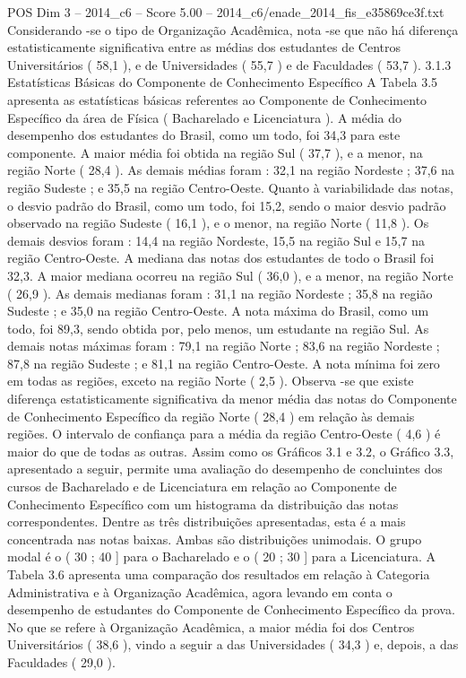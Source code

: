 \begin{textsample}{POS Dim 3 – 2014\_c6 – Score 5.00 – 2014\_c6/enade\_2014\_fis\_e35869ce3f.txt}
Considerando -se o tipo de Organização Acadêmica, nota -se que não há diferença estatisticamente significativa entre as médias dos estudantes de Centros Universitários ( 58,1 ), e de Universidades ( 55,7 ) e de Faculdades ( 53,7 ). 3.1.3 Estatísticas Básicas do Componente de Conhecimento Específico A Tabela 3.5 apresenta as estatísticas básicas referentes ao Componente de Conhecimento Específico da área de Física ( Bacharelado e Licenciatura ).
A média do desempenho dos estudantes do Brasil, como um todo, foi 34,3 para este componente.
A maior média foi obtida na região Sul ( 37,7 ), e a menor, na região Norte ( 28,4 ).
As demais médias foram : 32,1 na região Nordeste ; 37,6 na região Sudeste ; e 35,5 na região Centro-Oeste.
Quanto à variabilidade das notas, o desvio padrão do Brasil, como um todo, foi 15,2, sendo o maior desvio padrão observado na região Sudeste ( 16,1 ), e o menor, na região Norte ( 11,8 ).
Os demais desvios foram : 14,4 na região Nordeste, 15,5 na região Sul e 15,7 na região Centro-Oeste.
A mediana das notas dos estudantes de todo o Brasil foi 32,3.
A maior mediana ocorreu na região Sul ( 36,0 ), e a menor, na região Norte ( 26,9 ).
As demais medianas foram : 31,1 na região Nordeste ; 35,8 na região Sudeste ; e 35,0 na região Centro-Oeste.
A nota máxima do Brasil, como um todo, foi 89,3, sendo obtida por, pelo menos, um estudante na região Sul.
As demais notas máximas foram : 79,1 na região Norte ; 83,6 na região Nordeste ; 87,8 na região Sudeste ; e 81,1 na região Centro-Oeste.
A nota mínima foi zero em todas as regiões, exceto na região Norte ( 2,5 ).
Observa -se que existe diferença estatisticamente significativa da menor média das notas do Componente de Conhecimento Específico da região Norte ( 28,4 ) em relação às demais regiões.
O intervalo de confiança para a média da região Centro-Oeste ( 4,6 ) é maior do que de todas as outras.
Assim como os Gráficos 3.1 e 3.2, o Gráfico 3.3, apresentado a seguir, permite uma avaliação do desempenho de concluintes dos cursos de Bacharelado e de Licenciatura em relação ao Componente de Conhecimento Específico com um histograma da distribuição das notas correspondentes.
Dentre as três distribuições apresentadas, esta é a mais concentrada nas notas baixas.
Ambas são distribuições unimodais.
O grupo modal é o ( 30 ; 40 ] para o Bacharelado e o ( 20 ; 30 ] para a Licenciatura.
A Tabela 3.6 apresenta uma comparação dos resultados em relação à Categoria Administrativa e à Organização Acadêmica, agora levando em conta o desempenho de estudantes do Componente de Conhecimento Específico da prova.
No que se refere à Organização Acadêmica, a maior média foi dos Centros Universitários ( 38,6 ), vindo a seguir a das Universidades ( 34,3 ) e, depois, a das Faculdades ( 29,0 ).

\end{textsample}
